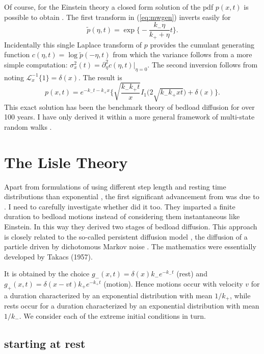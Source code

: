 \documentclass[11pt]{article}
\newcommand\be{\begin{equation}} %
\newcommand\ee{\end{equation}}   %
\newcommand\El{\mathcal{L}}
\begin{document}
Of course, for the Einstein theory a closed form solution of the pdf $p(x,t)$ is possible to obtain \citep[e.g.][]{Einstein1937, Hubbell1964, Daly2006,Daly2019}.
The first transform in (\ref{eq:mwgen}) inverts easily for \citep[i.e.][1.1.1.2]{Prudnikov1986}
\be \tilde{p}(\eta,t) = \exp\Big\{-\frac{k_-\eta }{k_+ + \eta} t\Big\}.\ee
Incidentally this single Laplace transform of $p$ provides the cumulant generating function $c(\eta,t) = \log \tilde{p}(-\eta,t)$ from which the variance follows from a more simple computation: $\sigma_x^2(t) = \partial_\eta^2 c(\eta,t)\big|_{\eta=0}.$
The second inversion follows from \citet[][2.2.2.8]{Prudnikov1986} noting $\El_x^{-1}\{1\} = \delta(x).$ The result is \citep[e.g.][]{Daly2019}
\be p(x,t) = e^{-k_- t -k_+ x}\Big\{ \sqrt{\frac{k_- k_+ t}{ x}} I_1\Big( 2\sqrt{k_-k_+ x t}\Big) + \delta(x) \Big\} .\ee
This exact solution has been the benchmark theory of bedload diffusion for over 100 years. I have only derived it within a more general framework of multi-state random walks \citep[e.g.][]{Weiss1994}.

\section{The Lisle Theory}
Apart from formulations of \citet{Einstein1937} using different step length and resting time distributions than exponential \citep[e.g.][]{Sayre1965}, the first significant advancement from \citet{Einstein1937} was due to \citet{Lisle1998}.
I need to carefully investigate whether \citet{Gordon1972} did it too.
They imparted a finite duration to bedload motions instead of considering them instantaneous like Einstein. In this way they derived two stages of bedload diffusion.
This approach is closely related to the so-called persistent diffusion model \citep{Balakrishnan1988,VanDenBroeck1990}, the diffusion of a particle driven by dichotomous Markov noise \citep[e.g.][]{Horsthemke1984,Risken1989,Bena2006}. 
The mathematics were essentially developed by Takacs (1957).

It is obtained by the choice $g_-(x,t) = \delta(x) k_- e^{-k_- t}$ (rest) and $g_+(x,t) = \delta(x-vt)k_+ e^{-k_+ t} $ (motion).
Hence motions occur with velocity $v$ for a duration characterized by an exponential distribution with mean $1/k_+$, while rests occur for a duration characterized by an exponential distribution with mean $1/k_-$. 
We consider each of the extreme initial conditions in turn.
\subsection{starting at rest}
\end{document}
